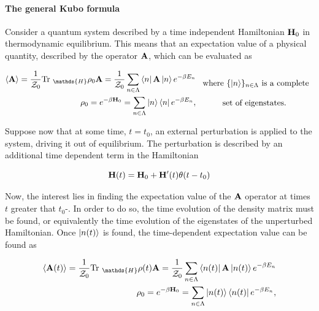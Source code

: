 \documentclass{homework}
\begin{document}
\paragraph{\textbf{The general Kubo formula}}

Consider a quantum system described by a time independent Hamiltonian ${\bf H}_0$ in thermodynamic equilibrium. This means that an expectation value of a physical quantity, described by the operator ${\bf A}$, which can be evaluated as 

\begin{equation}
    \begin{split}
        \langle {\bf A} \rangle = \frac{1}{\mathcal{Z}_0} \textnormal{Tr }_{\mathds{H}} \rho_0 {\bf A}  = \frac{1}{\mathcal{Z}_0} \sum_{n \in \Lambda} \bra{n} {{\bf A}} \ket{n} e^{-\beta E_n} \\
        \rho_0 = e^{-\beta {\bf H}_0} = \sum_{n \in \Lambda} \ket{n} \bra{n} e^{-\beta E_n},
    \end{split} \begin{array}{c}
         \textnormal{ where $\{\ket{n}\}_{n \in \Lambda}$ is a complete} \\
         \\
         \textnormal{set of eigenstates}.
    \end{array}
\end{equation}

Suppose now that at some time, $t = t_0$, an external perturbation is applied to the system, driving it out of equilibrium. The perturbation is described by an additional time dependent term in the Hamiltonian 

\begin{equation}
    {\bf H}(t) = {\bf H}_0 + {\bf H}'(t) \theta(t-t_0)
\end{equation}

Now, the interest lies in finding the expectation value of the ${\bf A}$ operator at times $t$ greater that $t_0$-. In order to do so, the time evolution of the density matrix must be found, or equivalently the time evolution of the eigenstates of the unperturbed Hamiltonian. Once $\ket{n(t)}$ is found, the time-dependent expectation value can be found as 

\begin{align}
        \langle {\bf A}(t) \rangle = \frac{1}{\mathcal{Z}_0} \textnormal{Tr }_{\mathds{H}} \rho(t) {\bf A}  = \frac{1}{\mathcal{Z}_0} \sum_{n \in \Lambda} \bra{n(t)} {{\bf A}} \ket{n(t)} e^{-\beta E_n} \\
        \rho_0 = e^{-\beta {\bf H}_0} = \sum_{n \in \Lambda} \ket{n(t)} \bra{n(t)} e^{-\beta E_n},
\end{align}
\end{document}
